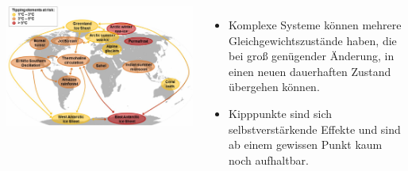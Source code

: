 \begin{frame}
\begin{columns}
	\end{columns}
	\begin{columns}
			\includegraphics[width=0.9\linewidth]{bilder/kipppunkte/tipping_elements}
			\begin{itemize}
				\item Komplexe Systeme können mehrere Gleichgewichtszustände haben, die bei groß genügender Änderung, in einen neuen dauerhaften Zustand übergehen können.
				\item Kipppunkte sind sich selbstverstärkende Effekte und sind ab einem gewissen Punkt kaum noch aufhaltbar.
			\end{itemize}
	\end{columns}
\end{frame}
